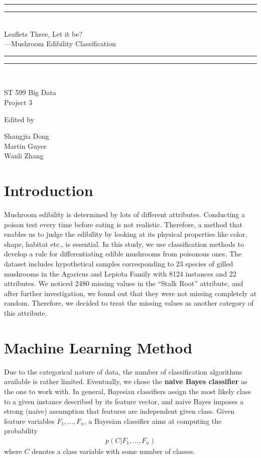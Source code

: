 \documentclass{article}
\newcommand*{\titleGP}{\begingroup %
\centering %
\vspace*{\baselineskip} %

\rule{\textwidth}{1.6pt}\vspace*{-\baselineskip}\vspace*{2pt} %
\rule{\textwidth}{0.4pt}\\[\baselineskip] %

{\LARGE Leaflets Three, Let it be?\\\vspace*{3mm}
---Mushroom Edibility Classification}\\[0.2\baselineskip] %

\rule{\textwidth}{0.4pt}\vspace*{-\baselineskip}\vspace{3.2pt} %
\rule{\textwidth}{1.6pt}\\[\baselineskip] %

\vspace*{2cm}

{\large ST 599 Big Data} \\ %
{\large Project 3} \\[\baselineskip] %

\vspace*{2\baselineskip} %

Edited by \\[\baselineskip]
{\Large Shangjia Dong \\ Martin Guyer \\ Wanli Zhang\par} %


\vfill %

\endgroup}
\begin{document}
\pagestyle{empty} %

\titleGP %

\pagebreak



\begin{multicols}{2}
\section{Introduction}
Mushroom edibility is determined by lots of different attributes. Conducting a poison test every time before eating is not realistic. Therefore, a method that enables us to judge the edibility by looking at its physical properties like color, shape, habitat etc., is essential. In this study, we use classification methods to develop a rule for differentiating edible mushrooms from poisonous ones. The dataset includes hypothetical samples corresponding to 23 species of gilled mushrooms in the Agaricus and Lepiota Family with 8124 instances and 22 attributes. We noticed 2480 missing values in the “Stalk Root” attribute, and after further investigation, we found out that they were not missing completely at random. Therefore, we decided to treat the missing values as another category of this attribute. 

\section{Machine Learning Method}
Due to the categorical nature of data, the number of classification algorithms available is rather limited. Eventually, we chose the \textbf{naive Bayes classifier} as the one to work with. In general, Bayesian classifiers assign the most likely class to a given instance described by its feature vector, and naive Bayes imposes a strong (naive) assumption that features are independent given class. Given feature variables $F_1,...,F_n$, a Bayesian classifier aims at computing the probability
\begin{align*}
p(C\vert F_1,...,F_n)
\end{align*}
where $C$ denotes a class variable with some number of classes.\\


\end{multicols}
\end{document}
